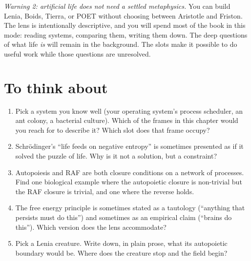 \textit{Warning 2: artificial life does not need a settled
metaphysics.} You can build Lenia, Boids, Tierra, or POET without
choosing between Aristotle and Friston. The lens is intentionally
descriptive, and you will spend most of the book in this mode: reading
systems, comparing them, writing them down. The deep questions of what
life \emph{is} will remain in the background. The slots make it possible
to do useful work while those questions are unresolved.

\section*{To think about}

\begin{enumerate}
  \item Pick a system you know well (your operating system's process
    scheduler, an ant colony, a bacterial culture). Which of the frames
    in this chapter would you reach for to describe it? Which slot does
    that frame occupy?
  \item Schr\"odinger's ``life feeds on negative entropy'' is sometimes
    presented as if it solved the puzzle of life. Why is it not a
    solution, but a constraint?
  \item Autopoiesis and RAF are both closure conditions on a network of
    processes. Find one biological example where the autopoietic closure
    is non-trivial but the RAF closure is trivial, and one where the
    reverse holds.
  \item The free energy principle is sometimes stated as a tautology
    (``anything that persists must do this'') and sometimes as an
    empirical claim (``brains do this''). Which version does the lens
    accommodate?
  \item Pick a Lenia creature. Write down, in plain prose, what its
    autopoietic boundary would be. Where does the creature stop and the
    field begin?
\end{enumerate}
